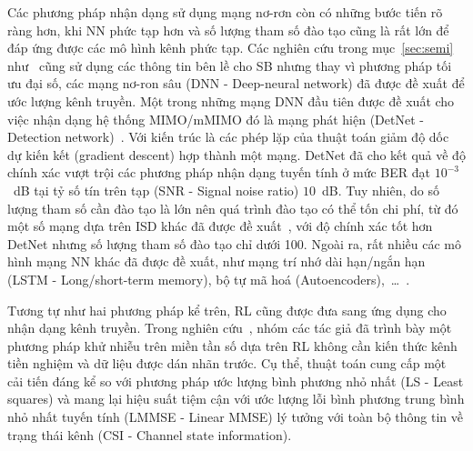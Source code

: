 Các phương pháp nhận dạng sử dụng mạng nơ-rơn còn có những bước tiến rõ ràng hơn, khi NN phức tạp hơn và số lượng tham số đào tạo cũng là rất lớn để đáp ứng được các mô hình kênh phức tạp. Các nghiên cứu trong mục~\ref{sec:semi} như~\cite{Lin2020, Wan2008} cũng sử dụng các thông tin bên lề cho SB nhưng thay vì phương pháp tối ưu đại số, các mạng nơ-ron sâu (DNN - Deep-neural network) đã được đề xuất để ước lượng kênh truyền. Một trong những mạng DNN đầu tiên được đề xuất cho việc nhận dạng hệ thống MIMO/mMIMO đó là mạng phát hiện (DetNet - Detection network)~\cite{Samuel2019}. Với kiến trúc là các phép lặp của thuật toán giảm độ dốc dự kiến kết (gradient descent) hợp thành một mạng. DetNet đã cho kết quả về độ chính xác vượt trội các phương pháp nhận dạng tuyến tính ở mức BER đạt $10^{-3}$~dB tại tỷ số tín trên tạp (SNR - Signal noise ratio) $10$~dB. Tuy nhiên, do số lượng tham số cần đào tạo là lớn nên quá trình đào tạo có thể tốn chi phí, từ đó một số mạng dựa trên ISD khác đã được đề xuất~\cite{Mandloi2017, Liao2020}, với độ chính xác tốt hơn DetNet nhưng số lượng tham số đào tạo chỉ dưới 100. Ngoài ra, rất nhiều các mô hình mạng NN khác đã được đề xuất, như mạng trí nhớ dài hạn/ngắn hạn (LSTM - Long/short-term memory), bộ tự mã hoá (Autoencoders),~\ldots~\cite{vilas2022}.

Tương tự như hai phương pháp kể trên, RL cũng được đưa sang ứng dụng cho nhận dạng kênh truyền. Trong nghiên cứu~\cite{Oh2021}, nhóm các tác giả đã trình bày một phương pháp khử nhiễu trên miền tần số dựa trên RL không cần kiến thức kênh tiền nghiệm và dữ liệu được dán nhãn trước. Cụ thể, thuật toán cung cấp một cải tiến đáng kể so với phương pháp ước lượng bình phương nhỏ nhất (LS - Least squares) và mang lại hiệu suất tiệm cận với ước lượng lỗi bình phương trung bình nhỏ nhất tuyến tính (LMMSE - Linear MMSE) lý tưởng với toàn bộ thông tin về trạng thái kênh (CSI - Channel state information).